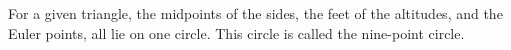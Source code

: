 For a given triangle, the midpoints of the sides, the feet of the 
altitudes, and the Euler points, all lie on one circle. This circle
is called the nine-point circle.